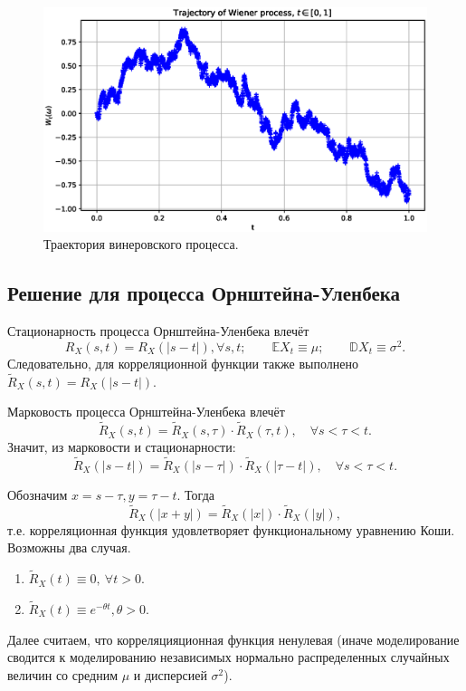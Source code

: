 \documentclass[11pt]{report}
\begin{document}
\begin{figure}[H]
    \centering
    \includegraphics[width=0.9\linewidth]{images/wiener-trajectory.eps}
    \caption{Траектория винеровского процесса.}
    \label{fig:wiener-trajectory}
\end{figure}

\subsection{Решение для процесса Орнштейна-Уленбека}

Стационарность процесса Орнштейна-Уленбека влечёт
$$
R_X(s,t) = R_X(|s-t|),\forall s,t;\qquad \mathbb{E}X_t \equiv \mu;\qquad \mathbb{D}X_t \equiv \sigma^2.
$$
Следовательно, для корреляционной функции также выполнено $\widetilde{R}_X(s,t)=R_X(|s-t|)$.

Марковость процесса Орнштейна-Уленбека влечёт
$$
\widetilde{R}_X(s,t) = \widetilde{R}_X(s,\tau)\cdot \widetilde{R}_X(\tau,t),\quad\forall s<\tau<t.
$$
Значит, из марковости и стационарности:
$$
\widetilde{R}_X(|s-t|) = \widetilde{R}_X(|s-\tau|)\cdot \widetilde{R}_X(|\tau - t|), \quad\forall s<\tau<t.
$$

Обозначим $x=s-\tau, y=\tau-t$. Тогда
$$
\widetilde{R}_X(|x+y|) = \widetilde{R}_X(|x|)\cdot \widetilde{R}_X(|y|),
$$
т.е. корреляционная функция удовлетворяет функциональному уравнению Коши. Возможны два случая.
\begin{enumerate}
\item $\widetilde{R}_X(t)\equiv 0,~\forall t>0$.
\item $\widetilde{R}_X(t)\equiv e^{-\theta t}, \theta>0$.
\end{enumerate}
Далее считаем, что корреляцияционная функция ненулевая (иначе моделирование сводится к моделированию независимых нормально распределенных случайных величин со средним $\mu$ и дисперсией $\sigma^2$).
\end{document}
